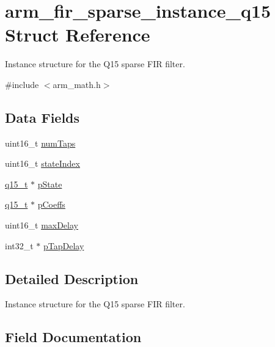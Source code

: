 \hypertarget{structarm__fir__sparse__instance__q15}{}\section{arm\+\_\+fir\+\_\+sparse\+\_\+instance\+\_\+q15 Struct Reference}
\label{structarm__fir__sparse__instance__q15}


Instance structure for the Q15 sparse F\+IR filter.  




{\ttfamily \#include $<$arm\+\_\+math.\+h$>$}

\subsection*{Data Fields}
\begin{DoxyCompactItemize}
\item 
uint16\+\_\+t \mbox{\hyperlink{structarm__fir__sparse__instance__q15_a751941891e47f522a7f5375fe8990aac}{num\+Taps}}
\item 
uint16\+\_\+t \mbox{\hyperlink{structarm__fir__sparse__instance__q15_a566a0cb53437e48b9a3bf18e5b03d8aa}{state\+Index}}
\item 
\mbox{\hyperlink{arm__math_8h_ab5a8fb21a5b3b983d5f54f31614052ea}{q15\+\_\+t}} $\ast$ \mbox{\hyperlink{structarm__fir__sparse__instance__q15_ae29dfdb736374fcddaeaec4b7770170c}{p\+State}}
\item 
\mbox{\hyperlink{arm__math_8h_ab5a8fb21a5b3b983d5f54f31614052ea}{q15\+\_\+t}} $\ast$ \mbox{\hyperlink{structarm__fir__sparse__instance__q15_a7ca181a37f714d174445f486bebce26f}{p\+Coeffs}}
\item 
uint16\+\_\+t \mbox{\hyperlink{structarm__fir__sparse__instance__q15_ab25f4ee7550e6d92acff77ada283733f}{max\+Delay}}
\item 
int32\+\_\+t $\ast$ \mbox{\hyperlink{structarm__fir__sparse__instance__q15_adec00b3793ab4f08edfeb4ea6a9eb6e6}{p\+Tap\+Delay}}
\end{DoxyCompactItemize}


\subsection{Detailed Description}
Instance structure for the Q15 sparse F\+IR filter. 

\subsection{Field Documentation}
\mbox{\label{structarm__fir__sparse__instance__q15_ab25f4ee7550e6d92acff77ada283733f}} 
